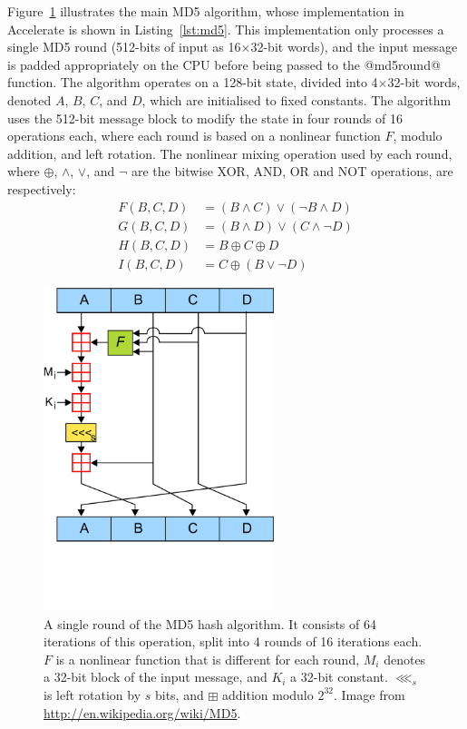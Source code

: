 Figure~\ref{fig:md5_round} illustrates the main MD5 algorithm, whose
implementation in Accelerate is shown in Listing~\ref{lst:md5}. This
implementation only processes a single MD5 round (512-bits of input as
16$\times$32-bit words), and the input message is padded appropriately on the
CPU before being passed to the @md5round@ function. The algorithm operates on a
128-bit state, divided into 4$\times$32-bit words, denoted $A$, $B$, $C$, and
$D$, which are initialised to fixed constants. The algorithm uses the 512-bit
message block to modify the state in four rounds of 16 operations each, where
each round is based on a nonlinear function $F$, modulo addition, and left
rotation. The nonlinear mixing operation used by each round, where $\oplus$,
$\wedge$, $\vee$, and $\neg$ are the bitwise XOR, AND, OR and NOT operations,
are respectively:
%
\begin{align*}
    F(B,C,D) &= (B \wedge C) \vee (\neg B \wedge D) \\
    G(B,C,D) &= (B \wedge D) \vee (C \wedge \neg D) \\
    H(B,C,D) &= B \oplus C \oplus D \\
    I(B,C,D) &= C \oplus (B \vee \neg D)
\end{align*}


\begin{figure}
    \centering
    \includegraphics[width=0.6\textwidth]{images/sec-6/MD5/MD5}
    \caption[A single round of the MD5 hash algorithm]{A single round of the MD5
        hash algorithm. It consists of 64 iterations of this operation, split
        into 4 rounds of 16 iterations each. $F$ is a nonlinear function that is
        different for each round, $M_i$ denotes a 32-bit block of the input
        message, and $K_i$ a 32-bit constant. $\lll_s$ is left rotation by $s$
        bits, and $\boxplus$ addition modulo $2^{32}$. Image from
        \url{http://en.wikipedia.org/wiki/MD5}.}
    \label{fig:md5_round}
\end{figure}


